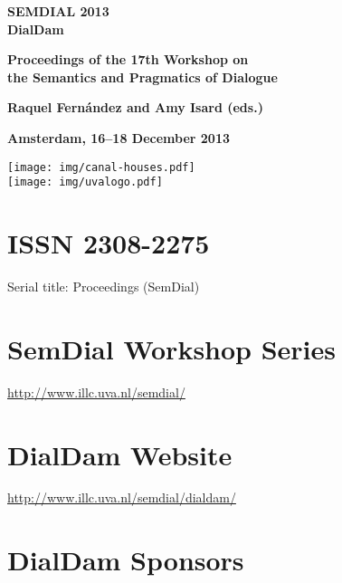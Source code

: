 \documentclass[a4paper,12pt,oneside]{book}
\begin{document}
\pagecolor{myred}
\thispagestyle{empty}
\vspace*{1.7cm}


\begin{center} \Huge \bf
SEMDIAL 2013\\
DialDam
\end{center}
\vfill
\begin{center} \LARGE \bf
Proceedings of the 17th Workshop on \\
the Semantics and Pragmatics of Dialogue
\end{center}

\begin{center}\large \bf
Raquel Fern\'andez and Amy Isard (eds.)
\end{center}
\vfill
\begin{center}\large \bf
Amsterdam, 16--18 December 2013
\end{center}
\vfill
\begin{center} 
\texttt{[image: img/canal-houses.pdf]}\\[5pt]
\texttt{[image: img/uvalogo.pdf]}
\end{center}

\clearpage
\thispagestyle{empty}
\nopagecolor
\section*{ISSN 2308-2275}
Serial title: Proceedings (SemDial)

\section*{SemDial Workshop Series}
\url{http://www.illc.uva.nl/semdial/}

\section*{DialDam Website}
\url{http://www.illc.uva.nl/semdial/dialdam/}

\vfill
\section*{DialDam Sponsors}
\end{document}
